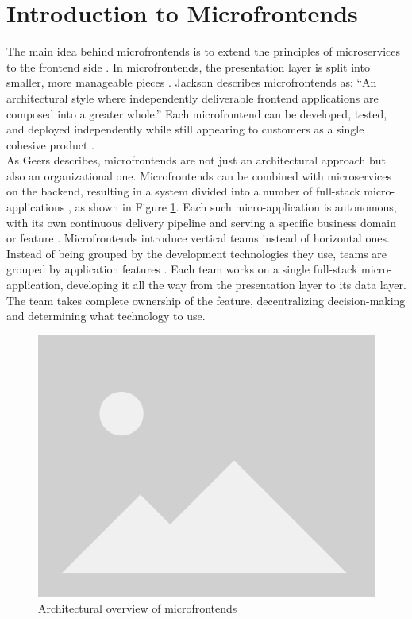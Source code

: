 \section{Introduction to Microfrontends}  
The main idea behind microfrontends is to extend the principles of microservices to the frontend side \cite{Montelius}\cite{Geers}. In microfrontends, the presentation layer is split into smaller, more manageable pieces \cite{Montelius}. Jackson \cite{Jackson} describes microfrontends as: “An architectural style where independently deliverable frontend applications are composed into a greater whole.” Each microfrontend can be developed, tested, and deployed independently while still appearing to customers as a single cohesive product \cite{Jackson}. \\ 

\noindent
As Geers \cite{Geers} describes, microfrontends are not just an architectural approach but also an organizational one. Microfrontends can be combined with microservices on the backend, resulting in a system divided into a number of full-stack micro-applications \cite{Montelius}, as shown in Figure \ref{fig:mfe-architecture}. Each such micro-application is autonomous, with its own continuous delivery pipeline and serving a specific business domain or feature \cite{Peltonen}. Microfrontends introduce vertical teams instead of horizontal ones. Instead of being grouped by the development technologies they use, teams are grouped by application features \cite{Montelius}. Each team works on a single full-stack micro-application, developing it all the way from the presentation layer to its data layer. The team takes complete ownership of the feature, decentralizing decision-making and determining what technology to use.  

\begin{figure}[h]  
  \centerline{\includegraphics[width=.5\textwidth]{images/placeholder.png}}  
  \caption[Architectural overview of microfrontends]{Architectural overview of microfrontends}  
  \label{fig:mfe-architecture}  
\end{figure}